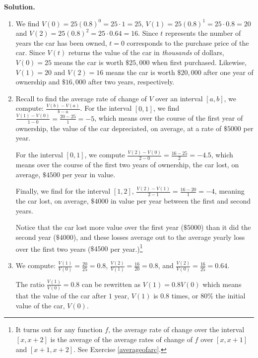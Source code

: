 \documentclass{ximera}
\begin{document}
{\begin{example}
{\bf Solution.}

\begin{enumerate}

\item We find $V(0) = 25(0.8)^{0} = 25 \cdot 1 = 25$, $V(1) = 25(0.8)^1 = 25 \cdot 0.8 = 20$ and $V(2) = 25(0.8)^2 = 25 \cdot 0.64 = 16$.  Since $t$ represents the number of years the car has been owned, $t=0$ corresponds to the purchase price of the car. Since $V(t)$ returns the value of the car in \textit{thousands} of dollars, $V(0) = 25$ means the car is worth $\$ 25, \! 000$ when first purchased.  Likewise, $V(1) = 20$  and $V(2) =16$ means the car is worth $\$20, \! 000$ after one year of ownership and  $\$16, \! 000$ after two years, respectively.

\item  Recall to find the average rate of change of $V$ over an interval $[a,b]$, we compute: $\frac{V(b) - V(a)}{b-a}$.  For the interval $[0,1]$, we find $\frac{V(1) - V(0)}{1-0} = \frac{20-25}{1} = -5$, which means over the course of the first year of ownership, the value of the car depreciated, on average, at a rate of $\$ 5000$ per year.  

\smallskip

For the interval $[0,1]$, we compute $\frac{V(2) - V(0)}{2-0} = \frac{16-25}{2} = -4.5$, which means over the course of the first two years of ownership, the car lost, on average,  $ \$4500$ per year in value. 
\smallskip

Finally, we find for the interval $[1,2]$,  $\frac{V(2) - V(1)}{2-1} = \frac{16-20}{1} = -4$, meaning the car lost, on average, $\$4000$ in value per year between the first and second years. 

\smallskip

Notice that the car lost more value over the first year ($\$5000$) than it did the second year ($\$4000$), and these losses average out to the average yearly loss over the first two years ($\$4500$ per year.)\footnote{It turns out for any function $f$, the average rate of change over the interval $[x, x+2]$ is the average of the average rates of change of $f$ over $[x, x+1]$ and $[x+1, x+2]$.  See Exercise \ref{averageofarc}.}


\item  We compute: $\frac{V(1)}{V(0)} = \frac{20}{25} = 0.8$, $\frac{V(2)}{V(1)} = \frac{16}{20} = 0.8$, and $\frac{V(2)}{V(0)} = \frac{16}{25} =0.64$.  


\smallskip

The ratio $\frac{V(1)}{V(0)} = 0.8$ can be rewritten as $V(1) = 0.8 V(0)$ which means that the value of the car after $1$ year, $V(1)$  is $0.8$ times, or $80 \%$ the initial value of the car, $V(0)$.  



\end{enumerate}
\end{example}}
\end{document}
